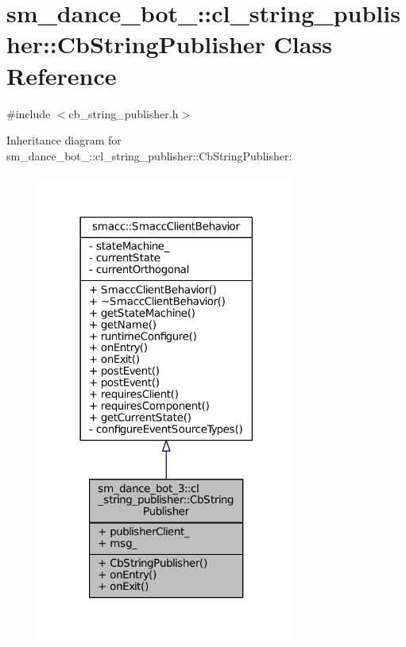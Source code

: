 \hypertarget{classsm__dance__bot__3_1_1cl__string__publisher_1_1CbStringPublisher}{}\section{sm\+\_\+dance\+\_\+bot\+\_\+:\+:cl\+\_\+string\+\_\+publisher\+:\+:Cb\+String\+Publisher Class Reference}
\label{classsm__dance__bot__3_1_1cl__string__publisher_1_1CbStringPublisher}


{\ttfamily \#include $<$cb\+\_\+string\+\_\+publisher.\+h$>$}



Inheritance diagram for sm\+\_\+dance\+\_\+bot\+\_\+:\+:cl\+\_\+string\+\_\+publisher\+:\+:Cb\+String\+Publisher\+:
\nopagebreak
\begin{figure}[H]
\begin{center}
\leavevmode
\includegraphics[width=242pt]{classsm__dance__bot__3_1_1cl__string__publisher_1_1CbStringPublisher__inherit__graph}
\end{center}
\end{figure}


